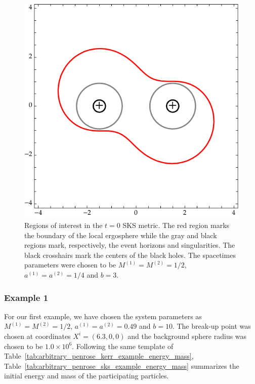 \begin{figure}[!ht]
  \centering
  \includegraphics[width=\linewidth]{img/penrose_binaries/sks_regions.pdf}
  \caption{Regions of interest in the $t=0$ \ac{SKS} metric. The red region marks the boundary of the local ergosphere while the gray and black regions mark, respectively, the event horizons and singularities. The black crosshairs mark the centers of the black holes. The spacetimes parameters were chosen to be $M^{(1)} = M^{(2)} = 1/2$, $a^{(1)} = a^{(2)} = 1/4$ and $b = 3$.}
  \label{fig:sks_ergo_plot}
\end{figure}

\subsubsection{Example 1}
\label{ch:sks_example_1}

For our first example, we have chosen the system parameters as $M^{(1)} = M^{(2)} = 1/2$, $a^{(1)} = a^{(2)} = 0.49$ and $b = 10$. The break-up point was chosen at coordinates $X^i = (6.3, 0, 0)$ and the background sphere radius was chosen to be $1.0 \times 10^6$. Following the same template of Table~\ref{tab:arbitrary_penrose_kerr_example_energy_mass}, Table~\ref{tab:arbitrary_penrose_sks_example_energy_mass} summarizes the initial energy and mass of the participating particles.


